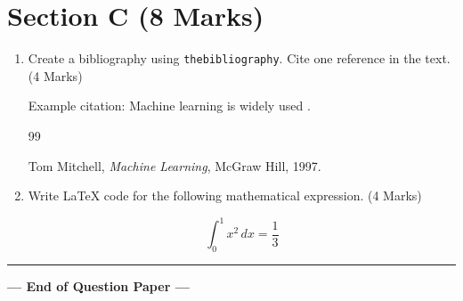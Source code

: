 \documentclass[12pt,a4paper]{article}
\begin{document}
	
	\section*{Section C (8 Marks)}
	
	\begin{enumerate}[label=\textbf{Q\arabic*.},start=7]
		
		\item Create a bibliography using \texttt{thebibliography}. Cite one reference in the text. \hfill (4 Marks)
		
		Example citation: Machine learning is widely used \cite{mlbook}.
		
		\begin{thebibliography}{99}
			
			Tom Mitchell,
			\textit{Machine Learning},
			McGraw Hill, 1997.
			
		\end{thebibliography}
		
		\item Write LaTeX code for the following mathematical expression. \hfill (4 Marks)
		
		\[
		\int_0^1 x^2\,dx = \frac{1}{3}
		\]
		
	\end{enumerate}
	
	
	\vfill
	\hrule
	
	\begin{center}
		\textbf{--- End of Question Paper ---}
	\end{center}
	
\end{document}
